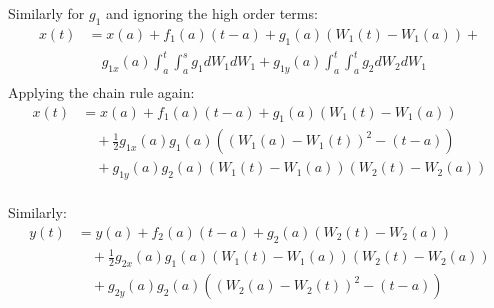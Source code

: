 \begin{frame}
Similarly for $g_1$ and ignoring the high order terms:
	\begin{equation*}
	\begin{split}
	x(t)&=x(a)+f_1(a)(t-a)+g_1(a)(W_1(t)-W_1(a))+\\
	&\quad g_{1x}(a)\int_{a}^{t}\int_{a}^{s}g_1dW_1dW_1 +g_{1y}(a)\int_{a}^{t}\int_{a}^{t} 		    g_2dW_2dW_1\\
	\end{split}
	\end{equation*}
Applying the chain rule again:
	\begin{equation*}
	\begin{split}
	x(t)&=x(a)+f_1(a)(t-a)+g_1(a)(W_1(t)-W_1(a))\\
	&\quad +\frac{1}{2}g_{1x}(a)g_{1}(a)((W_1(a)-W_1(t))^2-(t-a))\\
	&\quad +g_{1y}(a)g_2(a)(W_1(t)-W_1(a))(W_2(t)-W_2(a))\\
	\end{split}
	\end{equation*}
\end{frame}

\begin{frame}
Similarly:
\begin{equation*}
	\begin{split}
	y(t)&=y(a)+f_2(a)(t-a)+g_2(a)(W_2(t)-W_2(a))\\
	&\quad +\frac{1}{2}g_{2x}(a)g_{1}(a)(W_1(t)-W_1(a))(W_2(t)-W_2(a))\\
	&\quad +g_{2y}(a)g_2(a)((W_2(a)-W_2(t))^2-(t-a))\\
	\end{split}
	\end{equation*}
\end{frame}


